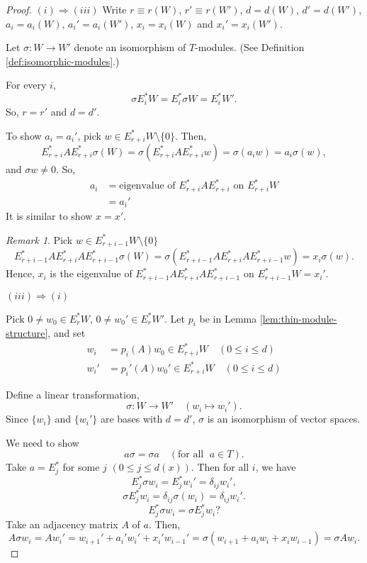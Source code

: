 \documentclass[
]{book}
\theoremstyle{definition}
\theoremstyle{definition}
\theoremstyle{definition}
\theoremstyle{definition}
\theoremstyle{remark}
\newtheorem*{remark}{Remark}
\begin{document}
\begin{proof}
\((i)\Rightarrow (iii)\)
Write \(r\equiv r(W)\), \(r' \equiv r(W')\), \(d = d(W)\), \(d' = d(W')\), \(a_i = a_i(W)\), \(a_i' = a_i(W')\), \(x_i = x_i(W)\) and \(x_i' = x_i(W')\).

Let \(\sigma: W\to W'\) denote an isomorphism of \(T\)-modules. (See Definition \ref{def:isomorphic-modules}.)

For every \(i\),
\[\sigma E^*_iW = E^*_i\sigma W = E^*_iW'.\]
So, \(r = r'\) and \(d = d'\).

To show \(a_i = a_i'\), pick \(w\in E^*_{r+i}W \setminus \{0\}\). Then,
\[E^*_{r+i}AE^*_{r+i}\sigma (W) = \sigma(E^*_{r+i}AE^*_{r+i}w) = \sigma(a_iw) = a_i\sigma(w), \]
and \(\sigma w\neq 0\). So,
\begin{align}
a_i & = \text{eigenvalue of $E^*_{r+i}AE^*_{r+i}$ on $E^*_{r+i}W$}\\
& = a_i'
\end{align}
It is similar to show \(x = x'\).

\begin{remark}
Pick \(w\in E^*_{r+i-1}W \setminus \{0\}\)
\[E^*_{r+i-1}AE^*_{r+i}AE^*_{r+i-1}\sigma(W) = \sigma(E^*_{r+i-1}AE^*_{r+i}AE^*_{r+i-1}w) = x_i\sigma(w).\]
Hence, \(x_i\) is the eigenvalue of \(E^*_{r+i-1}AE^*_{r+i}AE^*_{r+i-1}\) on \(E^*_{r+i-1}W = x_i'\).
\end{remark}

\((iii)\Rightarrow (i)\)

Pick \(0\neq w_0\in E^*_rW\), \(0\neq w_0'\in E^*_rW'\). Let \(p_i\) be in Lemma \ref{lem:thin-module-structure}, and set
\begin{align}
w_i & = p_i(A)w_0\in E^*_{r+i}W \quad (0\leq i\leq d) \\
w_i' & = p_i'(A)w_0' \in E^*_{r+i}W \quad (0\leq i\leq d)
\end{align}

Define a linear transformation,
\[\sigma: W \to W' \quad (w_i \mapsto w_i').\]
Since \(\{w_i\}\) and \(\{w_i'\}\) are bases with \(d = d'\), \(\sigma\) is an isomorphism of vector spaces.

We need to show
\[a\sigma = \sigma a \quad (\text{for all }\; a\in T).\]
Take \(a = E^*_j\) for some \(j\) \((0\leq j\leq d(x))\). Then for all \(i\), we have
\[E^*_j \sigma w_i = E^*_jw_i' = \delta_{ij}w_i',\]
\[\sigma E^*_jw_i = \delta_{ij}\sigma(w_i) = \delta_{ij}w_i'.\]
\[E^*_j \sigma w_i = \sigma E^*_jw_i?\]
Take an adjacency matrix \(A\) of \(a\). Then,
\[A\sigma w_i = Aw_i' = w_{i+1}' + a_i'w_i' + x_i'w_{i-1}' = \sigma(w_{i+1} + a_iw_i + x_iw_{i-1}) = \sigma Aw_i.\]


\end{proof}
\end{document}
